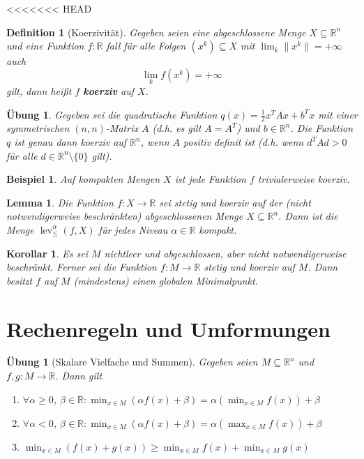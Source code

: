 \documentclass[11pt]{scrreprt}
\newcounter{thm}
\numberwithin{thm}{section}
\newtheorem{definition}[thm]{Definition}
\newtheorem{korollar}[thm]{Korollar}
\newtheorem{uebung}[thm]{Übung}
\newtheorem{beispiel}[thm]{Beispiel}
\newtheorem{uebung}[thm]{Übung}
\newtheorem{lemma}[thm]{Lemma}
\begin{document}
<<<<<<< HEAD
\setcounter{thm}{20}

\begin{definition}[Koerzivität]
	Gegeben seien eine abgeschlossene Menge $X \subseteq \mathbb{R}^n$ und eine Funktion $f \colon \mathbb{R}$ fall für alle Folgen $(x^k) \subseteq X$ mit $\lim_k \| x^k \| = +\infty$ auch
	$$ \lim_k f(x^k) = +\infty $$
	gilt, dann heißt $f$ \textbf{koerziv} auf $X$.
\end{definition}

\setcounter{thm}{23}

\begin{uebung}
		Gegeben sei die quadratische Funktion $q(x) = \frac{1}{2} x^T A x + b^T x$ mit einer symmetrischen $(n, n)$-Matrix $A$ (d.h. es gilt $A = A^T$) und $b \in \mathbb{R}^n$. Die Funktion $q$ ist genau dann koerziv auf $\mathbb{R}^n$, wenn $A$ positiv definit ist (d.h. wenn $d^T A d > 0$ für alle $d\in \mathbb{R}^n \setminus \{ 0 \}$ gilt).
\end{uebung}

\begin{beispiel}
	Auf kompakten Mengen $X$ ist jede Funktion $f$ trivialerweise koerziv.	
\end{beispiel}

\begin{lemma}
	Die Funktion $f \colon X \rightarrow \mathbb{R}$ sei stetig und koerziv auf der (nicht notwendigerweise beschränkten) abgeschlossenen Menge $X \subseteq \mathbb{R}^n$. Dann ist die Menge $\operatorname{lev}_{\leq}^{\alpha}(f, X)$ für jedes Niveau $\alpha \in \mathbb{R}$ kompakt.
\end{lemma}

\begin{korollar}
	Es sei $M$ nichtleer und abgeschlossen, aber nicht notwendigerweise beschränkt. Ferner sei die Funktion $f \colon M \rightarrow \mathbb{R}$ stetig und koerziv auf $M$. Dann besitzt $f$ auf $M$ (mindestens) einen globalen Minimalpunkt.
\end{korollar}

\section{Rechenregeln und Umformungen}

\begin{uebung}[Skalare Vielfache und Summen]
	Gegeben seien $M \subseteq \mathbb{R}^n$ und $f,g \colon M \rightarrow \mathbb{R}$. Dann gilt
	\begin{enumerate}[label=\alph*\upshape)]
		\item $\forall \alpha \geq 0$, $\beta \in \mathbb{R} \colon \min_{x \in M} \left( \alpha f(x) + \beta \right) = \alpha \left( \min_{x \in M} f(x) \right) + \beta$
		\item $\forall \alpha <0$, $\beta \in \mathbb{R} \colon \min_{x \in M} \left( \alpha f(x) + \beta \right) = \alpha \left( \max_{x \in M} f(x) \right) + \beta$
		\item $\min_{x \in M} \left( f(x) + g(x) \right) \geq \min_{x \in M} f(x) + \min_{x \in M} g(x)$
	\end{enumerate}
\end{uebung}
\end{document}
